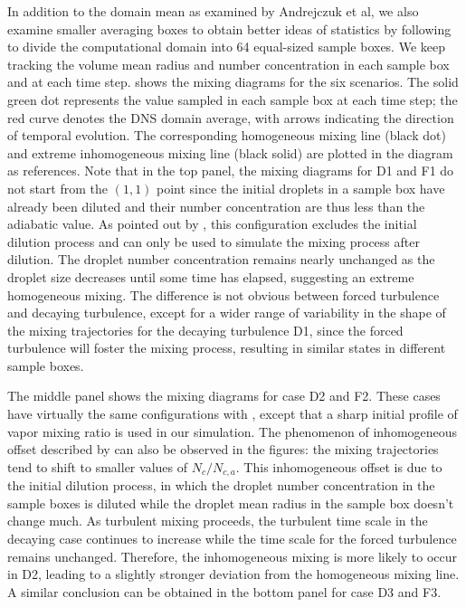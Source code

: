 \documentclass[draft,linenumbers]{agujournal}
\begin{document}
In addition to the domain mean as examined by Andrejczuk et al, we also examine smaller averaging boxes to obtain better ideas of statistics by following \citet{Kumar14} to divide the computational domain into 64 equal-sized sample boxes. We keep tracking the volume mean radius and number concentration in each sample box and at each time step.  shows the mixing diagrams for the six scenarios. The solid green dot represents the value sampled in each sample box at each time step; the red curve denotes the DNS domain average, with arrows indicating the direction of temporal evolution. The corresponding homogeneous mixing line (black dot) and extreme inhomogeneous mixing line (black solid) are plotted in the diagram as references. Note that in the top panel, the mixing diagrams for D1 and F1 do not start from the $(1,1)$ point since the initial droplets in a sample box have already been diluted and their number concentration are thus less than the adiabatic value. As pointed out by \citet{And04}, this configuration excludes the initial dilution process and can only be used to simulate the mixing process after dilution. The droplet number concentration remains nearly unchanged as the droplet size decreases until some time has elapsed, suggesting an extreme homogeneous mixing. The difference is not obvious between forced turbulence and decaying turbulence, except for a wider range of variability in the shape of the mixing trajectories for the decaying turbulence D1, since the forced turbulence will foster the mixing process, resulting in similar states in different sample boxes. 

The middle panel shows the mixing diagrams for case D2 and F2. These cases have virtually the same configurations with \citet{Kumar14}, except that a sharp initial profile of vapor mixing ratio is used in our simulation. The phenomenon of inhomogeneous offset described by \citet{Kumar14} can also be observed in the figures: the mixing trajectories tend to shift to smaller values of $N_c/N_{c,a}$. This inhomogeneous offset is due to the initial dilution process, in which the droplet number concentration in the sample boxes is diluted while the droplet mean radius in the sample box doesn't change much. As turbulent mixing proceeds, the turbulent time scale in the decaying case continues to increase while the time scale for the forced turbulence remains unchanged. Therefore, the inhomogeneous mixing is more likely to occur in D2, leading to a slightly stronger deviation from the homogeneous mixing line.  A similar conclusion can be obtained in the bottom panel for case D3 and F3. 
\end{document}

